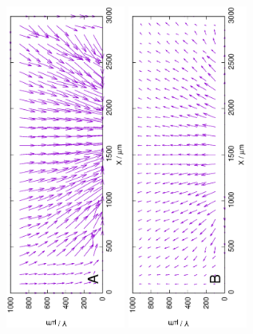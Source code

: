 


\begin{figure}
\centering
\includegraphics[width=0.35\textwidth, angle=-90]{img/mérések/Fe1_v.eps}
\includegraphics[width=0.35\textwidth, angle=-90]{img/mérések/Zn1_v.eps}

\end{figure}
